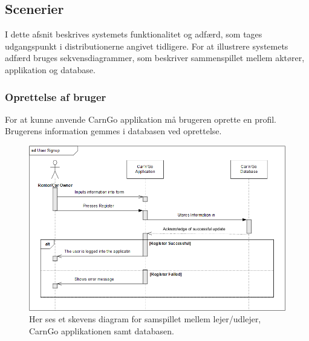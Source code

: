\documentclass[Arkitektur/System_main.tex]{subfiles}
\begin{document}
\subsection{Scenerier}
I dette afsnit beskrives systemets funktionalitet og adfærd, som tages udgangspunkt i distributionerne angivet tidligere. For at illustrere systemets adfærd bruges sekvensdiagrammer, som beskriver sammenspillet mellem aktører, applikation og database. 

\subsubsection{Oprettelse af bruger}
For at kunne anvende CarnGo applikation må brugeren oprette en profil. Brugerens information gemmes i databasen ved oprettelse. 
\begin{figure}[H]
    \centering
    \includegraphics[width=\textwidth]{Arkitektur/Softwarearkitektur/User_Signup/graphics/UserSignupSD.png}
    \caption{Her ses et skevens diagram for samspillet mellem lejer/udlejer, CarnGo applikationen samt databasen.}
    \label{fig:UserSignUpSD}
\end{figure}
\end{document}
